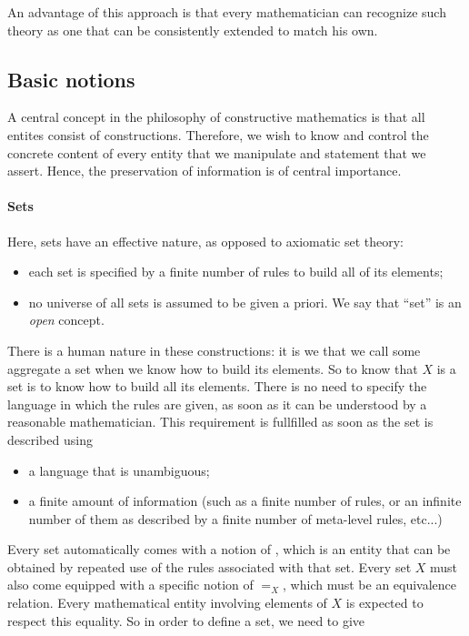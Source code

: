An advantage of this approach is that every mathematician can recognize such
theory as one that can be consistently extended to match his own.

\subsection{Basic notions}

A central concept in the philosophy of constructive mathematics is that all
entites consist of constructions. Therefore, we wish to know and control the
concrete content of every entity that we manipulate and statement that we
assert. Hence, the preservation of information is of central importance.

\paragraph{Sets}

Here, sets have an effective nature, as opposed to axiomatic set theory:

\begin{itemize}
\item each set is specified by a finite number of rules to build all of its
  elements;
\item no universe of all sets is assumed to be given a priori. We say that
  ``set'' is an \emph{open} concept.
\end{itemize}

There is a human nature in these constructions: it is we that we call some
aggregate a set when we know how to build its elements. So to know that $X$ is a
set is to know how to build all its elements.  There is no need to specify the
language in which the rules are given, as soon as it can be understood by a
reasonable mathematician. This requirement is fullfilled as soon as the set is
described using

\begin{itemize}
\item a language that is unambiguous;
\item a finite amount of information (such as a finite number of rules, or an
  infinite number of them as described by a finite number of meta-level rules,
  etc...)
\end{itemize}

Every set automatically comes with a notion of , which is an
entity that can be obtained by repeated use of the rules associated with that
set. Every set $X$ must also come equipped with a specific notion of
 $=_X$, which must be an equivalence relation. Every
mathematical entity involving elements of $X$ is expected to respect this
equality. So in order to define a set, we need to give

